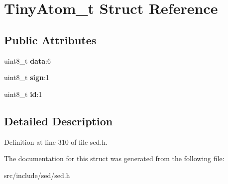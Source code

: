 \hypertarget{structTinyAtom__t}{}\section{Tiny\+Atom\+\_\+t Struct Reference}
\label{structTinyAtom__t}
\subsection*{Public Attributes}
\begin{DoxyCompactItemize}
\item 
\hypertarget{structTinyAtom__t_aa5e208321e608349cd7a828f33ecc533}{}uint8\+\_\+t {\bfseries data}\+:6\label{structTinyAtom__t_aa5e208321e608349cd7a828f33ecc533}

\item 
\hypertarget{structTinyAtom__t_a77137eb992cc6b002cae8af29ee07a81}{}uint8\+\_\+t {\bfseries sign}\+:1\label{structTinyAtom__t_a77137eb992cc6b002cae8af29ee07a81}

\item 
\hypertarget{structTinyAtom__t_aa4dcd153e58d92d98342eb1d77897c10}{}uint8\+\_\+t {\bfseries id}\+:1\label{structTinyAtom__t_aa4dcd153e58d92d98342eb1d77897c10}

\end{DoxyCompactItemize}


\subsection{Detailed Description}


Definition at line 310 of file sed.\+h.



The documentation for this struct was generated from the following file\+:\begin{DoxyCompactItemize}
\item 
src/include/sed/sed.\+h\end{DoxyCompactItemize}
